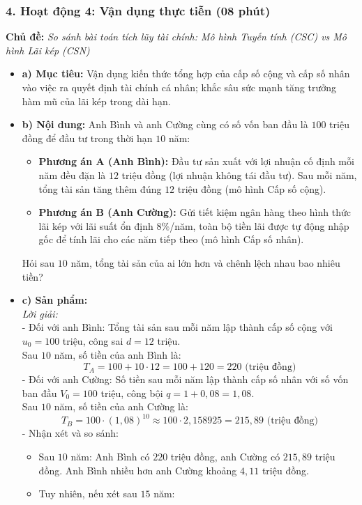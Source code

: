 \documentclass[12pt, a4paper]{article}
\begin{document}
\subsubsection*{4. Hoạt động 4: Vận dụng thực tiễn (08 phút)}
\textbf{Chủ đề:} \textit{So sánh bài toán tích lũy tài chính: Mô hình Tuyến tính (CSC) vs Mô hình Lãi kép (CSN)}
\begin{itemize}
    \item \textbf{a) Mục tiêu:} Vận dụng kiến thức tổng hợp của cấp số cộng và cấp số nhân vào việc ra quyết định tài chính cá nhân; khắc sâu sức mạnh tăng trưởng hàm mũ của lãi kép trong dài hạn.
    \item \textbf{b) Nội dung:} Anh Bình và anh Cường cùng có số vốn ban đầu là $100$ triệu đồng để đầu tư trong thời hạn $10$ năm:
    \begin{itemize}
        \item \textbf{Phương án A (Anh Bình):} Đầu tư sản xuất với lợi nhuận cố định mỗi năm đều đặn là $12$ triệu đồng (lợi nhuận không tái đầu tư). Sau mỗi năm, tổng tài sản tăng thêm đúng $12$ triệu đồng (mô hình Cấp số cộng).
        \item \textbf{Phương án B (Anh Cường):} Gửi tiết kiệm ngân hàng theo hình thức lãi kép với lãi suất ổn định $8\%$/năm, toàn bộ tiền lãi được tự động nhập gốc để tính lãi cho các năm tiếp theo (mô hình Cấp số nhân).
    \end{itemize}
    Hỏi sau $10$ năm, tổng tài sản của ai lớn hơn và chênh lệch nhau bao nhiêu tiền?
    \item \textbf{c) Sản phẩm:}\\
    \textit{Lời giải:}\\
    - Đối với anh Bình: Tổng tài sản sau mỗi năm lập thành cấp số cộng với $u_0 = 100$ triệu, công sai $d = 12$ triệu.\\
    Sau $10$ năm, số tiền của anh Bình là:
    $$T_A = 100 + 10 \cdot 12 = 100 + 120 = 220\text{ (triệu đồng)}$$
    - Đối với anh Cường: Số tiền sau mỗi năm lập thành cấp số nhân với số vốn ban đầu $V_0 = 100$ triệu, công bội $q = 1 + 0{,}08 = 1{,}08$.\\
    Sau $10$ năm, số tiền của anh Cường là:
    $$T_B = 100 \cdot (1{,}08)^{10} \approx 100 \cdot 2{,}158925 = 215{,}89\text{ (triệu đồng)}$$
    - Nhận xét và so sánh:
    \begin{itemize}
        \item Sau $10$ năm: Anh Bình có $220$ triệu đồng, anh Cường có $215{,}89$ triệu đồng. Anh Bình nhiều hơn anh Cường khoảng $4{,}11$ triệu đồng.
        \item Tuy nhiên, nếu xét sau $15$ năm:

\end{itemize}
\end{itemize}
\end{document}
